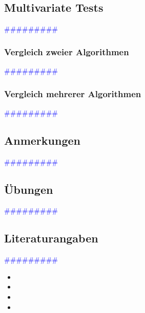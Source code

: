 \documentclass{article}
\begin{document}
  \subsection{Multivariate Tests} %
       \textcolor{blue}{\#\#\#\#\#\#\#\#\#}
    \subsubsection{Vergleich zweier Algorithmen} %
       \textcolor{blue}{\#\#\#\#\#\#\#\#\#}
    \subsubsection{Vergleich mehrerer Algorithmen} %
       \textcolor{blue}{\#\#\#\#\#\#\#\#\#}
  \subsection{Anmerkungen} %
       \textcolor{blue}{\#\#\#\#\#\#\#\#\#}
  \subsection{Übungen} %
       \textcolor{blue}{\#\#\#\#\#\#\#\#\#}
  \subsection{Literaturangaben} %
       \textcolor{blue}{\#\#\#\#\#\#\#\#\#}

      \begin{itemize}
      \color{red}
        \item
        \item
      \color{ForestGreen}
        \item
        \item
      \end{itemize}




\newpage
\end{document}
